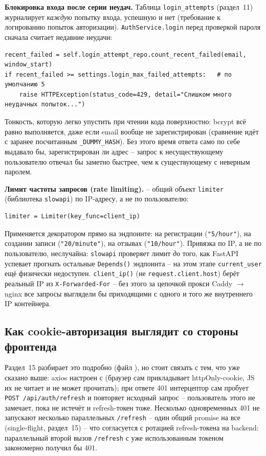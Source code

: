 \textbf{Блокировка входа после серии неудач.} Таблица
\texttt{login_attempts} (раздел~11) журналирует \emph{каждую} попытку
входа, успешную и нет (требование к логированию попыток авторизации).
\texttt{AuthService.login} перед проверкой пароля сначала считает
недавние неудачи:
\begin{verbatim}
recent_failed = self.login_attempt_repo.count_recent_failed(email, window_start)
if recent_failed >= settings.login_max_failed_attempts:   # по умолчанию 5
    raise HTTPException(status_code=429, detail="Слишком много неудачных попыток...")
\end{verbatim}
Тонкость, которую легко упустить при чтении кода поверхностно: bcrypt
всё равно выполняется, даже если email вообще не зарегистрирован
(сравнение идёт с заранее посчитанным \texttt{_DUMMY_HASH}). Без этого
время ответа само по себе выдавало бы, зарегистрирован ли адрес --
запрос к несуществующему пользователю отвечал бы заметно быстрее, чем к
существующему с неверным паролем.

\textbf{Лимит частоты запросов (rate limiting).}
 -- общий объект \texttt{limiter}
(библиотека \texttt{slowapi}) по IP-адресу, а не по пользователю:
\begin{verbatim}
limiter = Limiter(key_func=client_ip)
\end{verbatim}
Применяется декоратором прямо на эндпоинте:
 на регистрации
(\texttt{"5/hour"}),  на создании записи
(\texttt{"20/minute"}),  на отзывах
(\texttt{"10/hour"}). Привязка по IP, а не по пользователю, неслучайна:
\texttt{slowapi} проверяет лимит \emph{до} того, как FastAPI успевает
прогнать остальные \texttt{Depends()} эндпоинта -- на этом этапе
\texttt{current_user} ещё физически недоступен. \texttt{client_ip()}
(не \texttt{request.client.host}) берёт реальный IP из
\texttt{X-Forwarded-For} -- без этого за цепочкой прокси Caddy $\to$
nginx все запросы выглядели бы приходящими с одного и того же
внутреннего IP контейнера.

\subsection{Как cookie-авторизация выглядит со стороны фронтенда}

Раздел~15 разбирает это подробно (файл ), но
стоит связать с тем, что уже сказано выше: axios настроен с
 (браузер сам прикладывает httpOnly-cookie,
JS их не читает и не может прочитать); при ответе 401 интерцептор сам
пробует \texttt{POST /api/auth/refresh} и повторяет исходный запрос --
пользователь этого не замечает, пока не истечёт и refresh-токен тоже.
Несколько одновременных 401 не запускают несколько параллельных
\texttt{/refresh} -- один общий promise на все (single-flight, раздел~15) --
что согласуется с ротацией refresh-токена на backend: параллельный
второй вызов \texttt{/refresh} с уже использованным токеном закономерно
получил бы 401.

